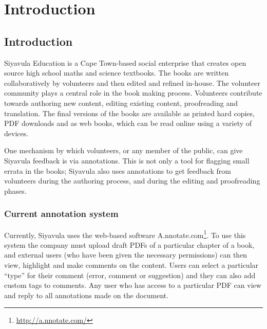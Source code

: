 
\chapter{Introduction} %

\label{Chapter1} %



\section{Introduction}
Siyavula Education is a Cape Town-based social enterprise that creates open source high school maths and science textbooks. The books are written collaboratively by volunteers and then edited and refined in-house. The volunteer community plays a central role in the book making process. Volunteers contribute towards authoring new content, editing existing content, proofreading and translation. The final versions of the books are available as printed hard copies, PDF downloads and as web books, which can be read online using a variety of devices. 

One mechanism by which volunteers, or any member of the public, can give Siyavula feedback is via annotations. This is not only a tool for flagging small errata in the books; Siyavula also uses annotations to get feedback from volunteers during the authoring process, and during the editing and proofreading phases.


\subsection{Current annotation system}

Currently, Siyavula uses the web-based software A.nnotate.com\footnote{\href{ http://a.nnotate.com/}{ http://a.nnotate.com/}}. To use this system the company must upload draft PDFs of a particular chapter of a book, and external users (who have been given the necessary permissions) can then view, highlight and make comments on the content. Users can select a particular “type” for their comment (error, comment or suggestion) and they can also add custom tags to comments. Any user who has access to a particular PDF can view and reply to all annotations made on the document. 

